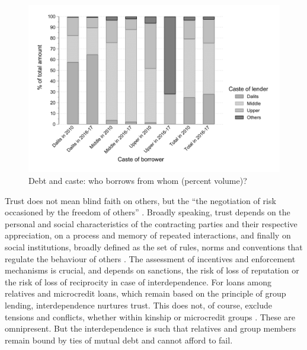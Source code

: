 \documentclass[a4paper, 11pt, onecolumn]{article}
\begin{document}
\begin{figure}[ht!]
\center
\includegraphics[width=12cm]{contengency_borrower_amount_stata.png}
\caption{Debt and caste: who borrows from whom (percent volume)?}
\label{cont:volume}
\end{figure}

Trust does not mean blind faith on others, but the ``the negotiation of risk occasioned by the freedom of others'' \citep[p.188]{Hart2000}. 
Broadly speaking, trust depends on the personal and social characteristics of the contracting parties and their respective appreciation, on a process and memory of repeated interactions, and finally on social institutions, broadly defined as the set of rules, norms and conventions that regulate the behaviour of others \citep{Platteau1994}. 
The assessment of incentives and enforcement mechanisms is crucial, and depends on sanctions, the risk of loss of reputation or the risk of loss of reciprocity in case of interdependence. 
For loans among relatives and microcredit loans, which remain based on the principle of group lending, interdependence nurtures trust. 
This does not, of course, exclude tensions and conflicts, whether within kinship or microcredit groups \citep{Kar2018}. 
These are omnipresent. 
But the interdependence is such that relatives and group members remain bound by ties of mutual debt and cannot afford to fail. 
\end{document}

